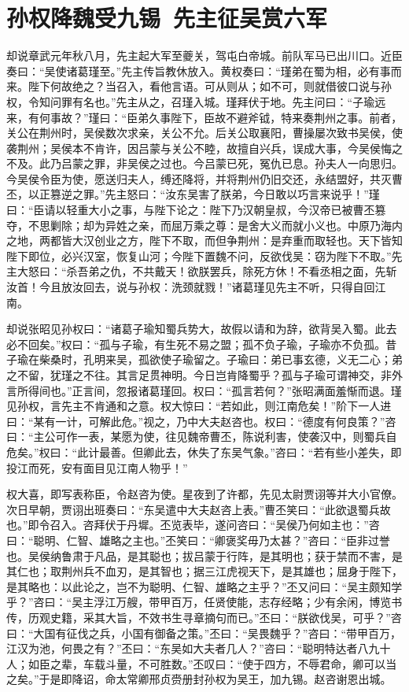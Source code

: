 \chapter{孙权降魏受九锡~先主征吴赏六军}

却说章武元年秋八月，先主起大军至夔关，驾屯白帝城。前队军马已出川口。近臣奏曰：“吴使诸葛瑾至。”先主传旨教休放入。黄权奏曰：“瑾弟在蜀为相，必有事而来。陛下何故绝之？当召入，看他言语。可从则从；如不可，则就借彼口说与孙权，令知问罪有名也。”先主从之，召瑾入城。瑾拜伏于地。先主问曰：“子瑜远来，有何事故？”瑾曰：“臣弟久事陛下，臣故不避斧钺，特来奏荆州之事。前者，关公在荆州时，吴侯数次求亲，关公不允。后关公取襄阳，曹操屡次致书吴侯，使袭荆州；吴侯本不肯许，因吕蒙与关公不睦，故擅自兴兵，误成大事，今吴侯悔之不及。此乃吕蒙之罪，非吴侯之过也。今吕蒙已死，冤仇已息。孙夫人一向思归。今吴侯令臣为使，愿送归夫人，缚还降将，并将荆州仍旧交还，永结盟好，共灭曹丕，以正篡逆之罪。”先主怒曰：“汝东吴害了朕弟，今日敢以巧言来说乎！”瑾曰：“臣请以轻重大小之事，与陛下论之：陛下乃汉朝皇叔，今汉帝已被曹丕篡夺，不思剿除；却为异姓之亲，而屈万乘之尊：是舍大义而就小义也。中原乃海内之地，两都皆大汉创业之方，陛下不取，而但争荆州：是弃重而取轻也。天下皆知陛下即位，必兴汉室，恢复山河；今陛下置魏不问，反欲伐吴：窃为陛下不取。”先主大怒曰：“杀吾弟之仇，不共戴天！欲朕罢兵，除死方休！不看丞相之面，先斩汝首！今且放汝回去，说与孙权：洗颈就戮！”诸葛瑾见先主不听，只得自回江南。

却说张昭见孙权曰：“诸葛子瑜知蜀兵势大，故假以请和为辞，欲背吴入蜀。此去必不回矣。”权曰：“孤与子瑜，有生死不易之盟；孤不负子瑜，子瑜亦不负孤。昔子瑜在柴桑时，孔明来吴，孤欲使子瑜留之。子瑜曰：弟已事玄德，义无二心；弟之不留，犹瑾之不往。其言足贯神明。今日岂肯降蜀乎？孤与子瑜可谓神交，非外言所得间也。”正言间，忽报诸葛瑾回。权曰：“孤言若何？”张昭满面羞惭而退。瑾见孙权，言先主不肯通和之意。权大惊曰：“若如此，则江南危矣！”阶下一人进曰：“某有一计，可解此危。”视之，乃中大夫赵咨也。权曰：“德度有何良策？”咨曰：“主公可作一表，某愿为使，往见魏帝曹丕，陈说利害，使袭汉中，则蜀兵自危矣。”权曰：“此计最善。但卿此去，休失了东吴气象。”咨曰：“若有些小差失，即投江而死，安有面目见江南人物乎！”

权大喜，即写表称臣，令赵咨为使。星夜到了许都，先见太尉贾诩等并大小官僚。次日早朝，贾诩出班奏曰：“东吴遣中大夫赵咨上表。”曹丕笑曰：“此欲退蜀兵故也。”即令召入。咨拜伏于丹墀。丕览表毕，遂问咨曰：“吴侯乃何如主也：”咨曰：“聪明、仁智、雄略之主也。”丕笑曰：“卿褒奖毋乃太甚？”咨曰：“臣非过誉也。吴侯纳鲁肃于凡品，是其聪也；拔吕蒙于行阵，是其明也；获于禁而不害，是其仁也；取荆州兵不血刃，是其智也；据三江虎视天下，是其雄也；屈身于陛下，是其略也：以此论之，岂不为聪明、仁智、雄略之主乎？”丕又问曰：“吴主颇知学乎？”咨曰：“吴主浮江万艘，带甲百万，任贤使能，志存经略；少有余闲，博览书传，历观史籍，采其大旨，不效书生寻章摘句而已。”丕曰：“朕欲伐吴，可乎？”咨曰：“大国有征伐之兵，小国有御备之策。”丕曰：“吴畏魏乎？”咨曰：“带甲百万，江汉为池，何畏之有？”丕曰：“东吴如大夫者几人？”咨曰：“聪明特达者八九十人；如臣之辈，车载斗量，不可胜数。”丕叹曰：“使于四方，不辱君命，卿可以当之矣。”于是即降诏，命太常卿邢贞赍册封孙权为吴王，加九锡。赵咨谢恩出城。

